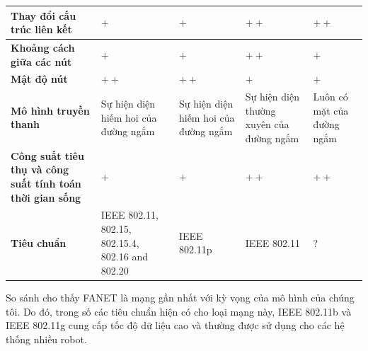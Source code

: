 \documentclass[11pt,openany]{book}
\begin{document}
\begin{algorimth}[H]
\begin{table}[H]
\begin{tabular}{|p{2.8cm}|p{1.5cm}|p{1.5cm}|p{1.8cm}|p{1.8cm}|}
        \textbf{Thay đổi cấu trúc liên kết}                               & $+$                                                 & $+$                                  & $++$                                                                                           & $++$                                \\\hline
        \textbf{Khoảng cách giữa các nút}                                 & $+$                                                 & $+$                                  & $++$                                                                                           & $+$                                 \\\hline
        \textbf{Mật độ nút}                                               & $++$                                                & $++$                                 & $+$                                                                                            & $+$                                 \\\hline
        \textbf{Mô hình truyền thanh}                                     & Sự hiện diện hiếm hoi của đường ngắm                & Sự hiện diện hiếm hoi của đường ngắm & Sự hiện diện thường xuyên của đường ngắm                                                       & Luôn có mặt của đường ngắm          \\\hline
        \textbf{Công suất tiêu thụ và công suất tính toán thời gian sống} & $+$                                                 & $+$                                  & $++$                                                                                           & $++$                                \\\hline
        \textbf{Tiêu chuẩn}                                               & IEEE 802.11, 802.15, 802.15.4, 802.16 and 802.20    & IEEE 802.11p                         & IEEE 802.11                                                                                    & ?                                   \\\hline
    \end{tabular}
\end{table}
So sánh cho thấy FANET là mạng gần nhất với kỳ vọng của mô hình của chúng tôi. Do đó, trong số các tiêu chuẩn hiện có cho loại mạng này, IEEE 802.11b và IEEE 802.11g cung cấp tốc độ dữ liệu cao và thường được sử dụng cho các hệ thống nhiều robot.

\end{algorimth}
\end{document}
